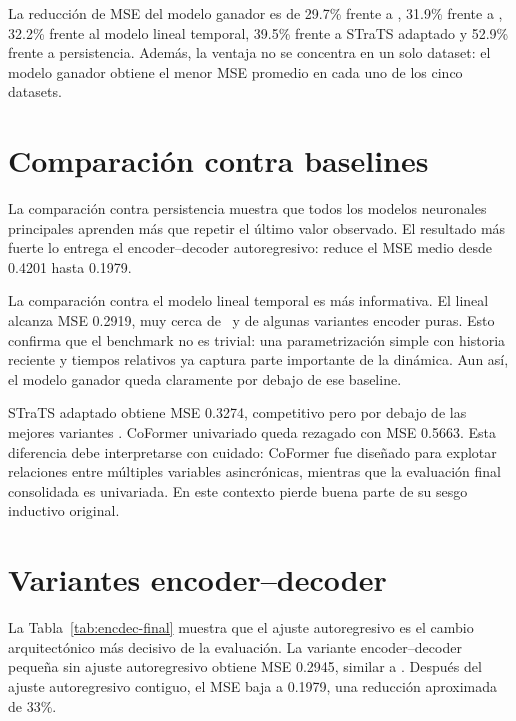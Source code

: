 La reducción de MSE del modelo ganador es de 29.7\% frente a \CTTransformerSmall, 31.9\% frente a \CTTransformerBase, 32.2\% frente al modelo lineal temporal, 39.5\% frente a STraTS adaptado y 52.9\% frente a persistencia. Además, la ventaja no se concentra en un solo dataset: el modelo ganador obtiene el menor MSE promedio en cada uno de los cinco datasets.

\section{Comparación contra baselines}
\label{sec:comparacion-baselines-final}

La comparación contra persistencia muestra que todos los modelos neuronales principales aprenden más que repetir el último valor observado. El resultado más fuerte lo entrega el encoder--decoder autoregresivo: reduce el MSE medio desde 0.4201 hasta 0.1979.

\hfill

La comparación contra el modelo lineal temporal es más informativa. El lineal alcanza MSE 0.2919, muy cerca de \CTTransformerBase\ y de algunas variantes encoder puras. Esto confirma que el benchmark no es trivial: una parametrización simple con historia reciente y tiempos relativos ya captura parte importante de la dinámica. Aun así, el modelo ganador queda claramente por debajo de ese baseline.

\hfill

STraTS adaptado obtiene MSE 0.3274, competitivo pero por debajo de las mejores variantes \CTTransformer. CoFormer univariado queda rezagado con MSE 0.5663. Esta diferencia debe interpretarse con cuidado: CoFormer fue diseñado para explotar relaciones entre múltiples variables asincrónicas, mientras que la evaluación final consolidada es univariada. En este contexto pierde buena parte de su sesgo inductivo original.

\section{Variantes encoder--decoder}
\label{sec:variantes-encoder-decoder-final}

La Tabla~\ref{tab:encdec-final} muestra que el ajuste autoregresivo es el cambio arquitectónico más decisivo de la evaluación. La variante encoder--decoder pequeña sin ajuste autoregresivo obtiene MSE 0.2945, similar a \CTTransformerBase. Después del ajuste autoregresivo contiguo, el MSE baja a 0.1979, una reducción aproximada de 33\%.

